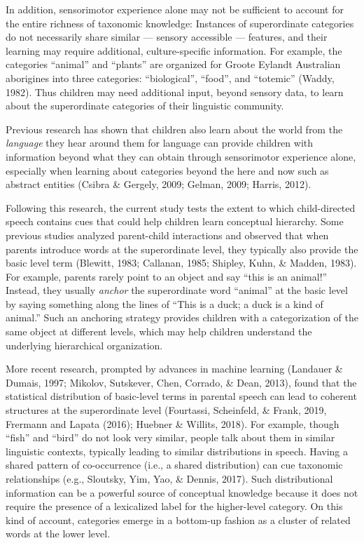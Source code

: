 \documentclass[english,,man,floatsintext]{apa6}
\begin{document}
In addition, sensorimotor experience alone may not be sufficient to account for the entire richness of taxonomic knowledge: Instances of superordinate categories do not necessarily share similar --- sensory accessible --- features, and their learning may require additional, culture-specific information. For example, the categories \enquote{animal} and \enquote{plants} are organized for Groote Eylandt Australian aborigines into three categories: \enquote{biological}, \enquote{food}, and \enquote{totemic} (Waddy, 1982). Thus children may need additional input, beyond sensory data, to learn about the superordinate categories of their linguistic community.

Previous research has shown that children also learn about the world from the \emph{language} they hear around them for language can provide children with information beyond what they can obtain through sensorimotor experience alone, especially when learning about categories beyond the here and now such as abstract entities (Csibra \& Gergely, 2009; Gelman, 2009; Harris, 2012).

Following this research, the current study tests the extent to which child-directed speech contains cues that could help children learn conceptual hierarchy. Some previous studies analyzed parent-child interactions and observed that when parents introduce words at the superordinate level, they typically also provide the basic level term (Blewitt, 1983; Callanan, 1985; Shipley, Kuhn, \& Madden, 1983). For example, parents rarely point to an object and say \enquote{this is an animal!} Instead, they usually \emph{anchor} the superordinate word \enquote{animal} at the basic level by saying something along the lines of \enquote{This is a duck; a duck is a kind of animal.} Such an anchoring strategy provides children with a categorization of the same object at different levels, which may help children understand the underlying hierarchical organization.

More recent research, prompted by advances in machine learning (Landauer \& Dumais, 1997; Mikolov, Sutskever, Chen, Corrado, \& Dean, 2013), found that the statistical distribution of basic-level terms in parental speech can lead to coherent structures at the superordinate level (Fourtassi, Scheinfeld, \& Frank, 2019, Frermann and Lapata (2016); Huebner \& Willits, 2018). For example, though \enquote{fish} and \enquote{bird} do not look very similar, people talk about them in similar linguistic contexts, typically leading to similar distributions in speech. Having a shared pattern of co-occurrence (i.e., a shared distribution) can cue taxonomic relationships (e.g., Sloutsky, Yim, Yao, \& Dennis, 2017). Such distributional information can be a powerful source of conceptual knowledge because it does not require the presence of a lexicalized label for the higher-level category. On this kind of account, categories emerge in a bottom-up fashion as a cluster of related words at the lower level.
\end{document}
